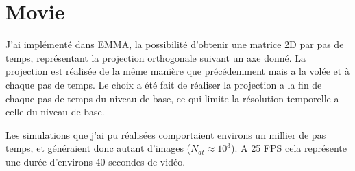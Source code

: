 %
%
%
%
%
%
%
%




\section{Movie}


J'ai implémenté dans EMMA, la possibilité d'obtenir une matrice 2D par pas de temps, représentant la projection orthogonale suivant un axe donné.
La projection est réalisée de la même manière que précédemment mais a la volée et à chaque pas de temps.
Le choix a été fait de réaliser la projection a la fin de chaque pas de temps du niveau de base, ce qui limite la résolution temporelle a celle du niveau de base.


Les simulations que j'ai pu réalisées comportaient environs un millier de pas temps, et généraient donc autant d'images ($N_{dt} \approx 10^3$).
A 25 \ac{FPS} cela représente une durée d'environs 40 secondes de vidéo.

